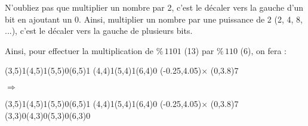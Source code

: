 \documentclass[11pt,a4paper]{article}
\begin{document}
\medskip

N'oubliez pas que multiplier un nombre par 2, c'est le décaler vers la gauche d'un bit en ajoutant un 0.
Ainsi, multiplier un nombre par une puissance de 2 (2, 4, 8, ...), c'est le décaler vers la gauche de plusieurs bits.

\medskip

Ainsi, pour effectuer la multiplication de \og $ \% \, 1101 $ \fg{} (13) par \og $ \% \, 110 $ \fg{} (6), on fera :

\begin{center}

\begin{table}[ht!]
  \centering
  \begin{minipage}{0.15\textwidth}

\par\vspace{6\oplineheight}
\oplput(3,5){1}\oplput(4,5){1}\oplput(5,5){0}\oplput(6,5){1}
\oplput(4,4){1}\oplput(5,4){1}\oplput(6,4){0}
\oplput(-0.25,4.05){$\times$}
\ophline(0,3.8){7}

  \end{minipage}
  \hfillx
  \begin{minipage}{0.1\textwidth}
    \centering

$ \Rightarrow $

  \end{minipage}
  \hfillx
  \begin{minipage}{0.15\textwidth}

\par\vspace{6\oplineheight}
\oplput(3,5){1}\oplput(4,5){1}\oplput(5,5){0}\oplput(6,5){1}
\oplput(4,4){1}\oplput(5,4){1}\oplput(6,4){0}
\oplput(-0.25,4.05){$\times$}
\ophline(0,3.8){7}
\oplput(3,3){0}\oplput(4,3){0}\oplput(5,3){0}\oplput(6,3){0}

  \end{minipage}
  \hfillx
  \begin{minipage}{0.1\textwidth}
    \centering


\end{minipage}
\end{table}
\end{center}
\end{document}
